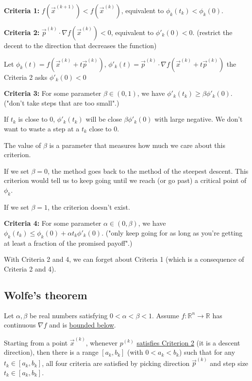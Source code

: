 \documentclass[11pt]{elegantbook}
\begin{document}
\begin{claim}[Criteria 1]
    \textbf{Criteria 1:} $f(\vec{x}^{(k+1)})<f(\vec{x}^{(k)})$, equivalent to $\phi_k(t_k)<\phi_k(0)$.
\end{claim}

\begin{claim}[Criteria 2]
    \textbf{Criteria 2:} $\vec{p}^{(k)}\cdot \nabla f(\vec{x}^{(k)})<0$, equivalent to $\phi'_k(0)<0$. (restrict the decent to the direction that decreases the function)
\end{claim}

Let $\phi_k(t)=f(\vec{x}^{(k)}+t \vec{p}^{(k)})$, $\phi'_k(t)=\vec{p}^{(k)}\cdot \nabla f(\vec{x}^{(k)}+t \vec{p}^{(k)})$ the Criteria 2 asks $\phi'_k(0)<0$

\begin{claim}[Criteria 3]
    \textbf{Criteria 3:} For some parameter $\beta\in (0,1)$, we have $\phi'_k(t_k)\geq \beta\phi'_k(0)$. ("don't take steps that are too small".)
\end{claim}

If $t_k$ is close to $0$, $\phi'_k(t_k)$ will be close $\beta\phi'_k(0)$ with large negative. We don't want to waste a step at a $t_k$ close to $0$.

The value of $\beta$ is a parameter that measures how much we care about this criterion.

If we set $\beta=0$, the method goes back to the method of the steepest descent. This
criterion would tell us to keep going until we reach (or go past) a critical point of $\phi_k$.

If we set $\beta=1$, the criterion doesn't exist.
\begin{claim}[Criteria 4]
    \textbf{Criteria 4:} For some parameter $\alpha\in (0,\beta)$, we have $\phi_k(t_k)\leq \phi_k(0)+\alpha t_k\phi'_k(0)$. ("only keep going for as long as you're getting at least a fraction of the promised
    payoff".)
\end{claim}

With Criteria 2 and 4, we can forget about Criteria 1 (which is a consequence of Criteria 2 and 4).

\subsection{Wolfe's theorem}
\begin{theorem}
    Let $\alpha,\beta$ be real numbers satisfying $0 <\alpha < \beta < 1$. Assume $f : \mathbb{R}^n \rightarrow \mathbb{R}$ has continuous $\nabla f$ and is \underline{bounded below}.
    
    Starting from a point $\vec{x}^{(k)}$, whenever $p^{(k)}$ \underline{satisfies Criterion 2} (it is a descent direction), then there is a range $[a_k, b_k]$ (with $0 < a_k < b_k$) such that for any $t_k \in [a_k, b_k]$, all four criteria are satisfied by picking direction $\vec{p}^{(k)}$ and step size $t_k\in [a_k,b_k]$.
\end{theorem}
\end{document}
